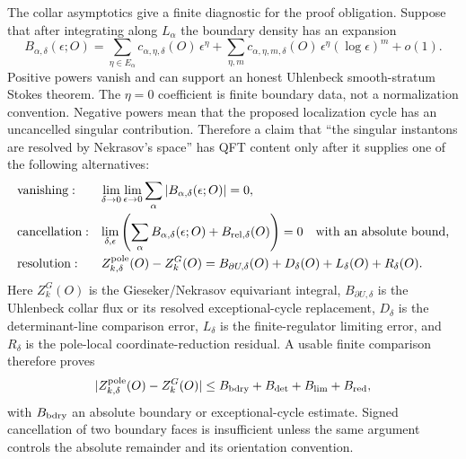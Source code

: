 \begin{controlledapproximation}
The collar asymptotics give a finite diagnostic for the proof obligation.
Suppose that after integrating along \(L_\alpha\) the boundary density has an
expansion
\[
  B_{\alpha,\delta}(\epsilon;O)
  =
  \sum_{\eta\in E_\alpha}
  c_{\alpha,\eta,\delta}(O)\,\epsilon^\eta
  +\sum_{\eta,m}
  c_{\alpha,\eta,m,\delta}(O)\,\epsilon^\eta(\log\epsilon)^m
  +o(1).
\]
Positive powers vanish and can support an honest Uhlenbeck smooth-stratum
Stokes theorem.  The \(\eta=0\) coefficient is finite boundary data, not a
normalization convention.  Negative powers mean that the proposed localization
cycle has an uncancelled singular contribution.  Therefore a claim that
``the singular instantons are resolved by Nekrasov's space'' has QFT content
only after it supplies one of the following alternatives:
\[
\begin{array}{ll}
{\rm vanishing:}
&
  \displaystyle
  \lim_{\delta\to0}\lim_{\epsilon\to0}
  \sum_\alpha |B_{\alpha,\delta}(\epsilon;O)|=0,
\\[1.2em]
{\rm cancellation:}
&
  \displaystyle
  \lim_{\delta,\epsilon}
  \left(
    \sum_\alpha B_{\alpha,\delta}(\epsilon;O)
    +B_{\rm rel,\delta}(O)
  \right)=0
  \quad\hbox{with an absolute bound,}
\\[1.2em]
{\rm resolution:}
&
  \displaystyle
  Z_{k,\delta}^{\rm pole}(O)-Z_{k}^{G}(O)
  =
  B_{\partial U,\delta}(O)
  +D_{\delta}(O)+L_{\delta}(O)+R_{\delta}(O).
\end{array}
\]
Here \(Z_k^G(O)\) is the Gieseker/Nekrasov equivariant integral,
\(B_{\partial U,\delta}\) is the Uhlenbeck collar flux or its resolved
exceptional-cycle replacement, \(D_\delta\) is the determinant-line
comparison error, \(L_\delta\) is the finite-regulator limiting error, and
\(R_\delta\) is the pole-local coordinate-reduction residual.  A usable
finite comparison therefore proves
\begin{equation}
  |Z_{k,\delta}^{\rm pole}(O)-Z_k^G(O)|
  \le
  B_{\rm bdry}+B_{\rm det}+B_{\rm lim}+B_{\rm red},
  \label{eq:uhlenbeck-gieseker-selection-bound}
\end{equation}
with \(B_{\rm bdry}\) an absolute boundary or exceptional-cycle estimate.
Signed cancellation of two boundary faces is insufficient unless the same
argument controls the absolute remainder and its orientation convention.


\end{controlledapproximation}
